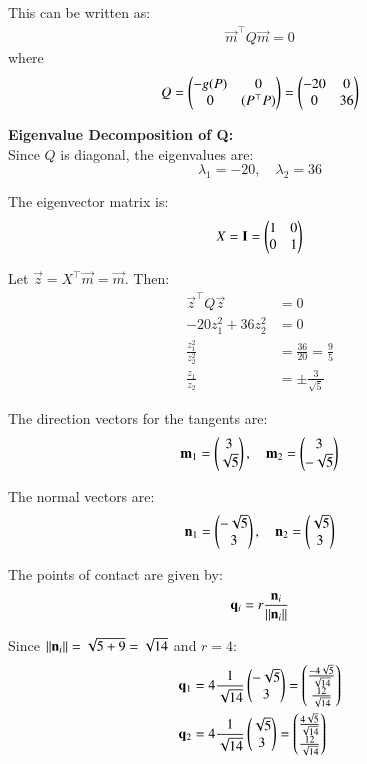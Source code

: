 \documentclass[article]{IEEEtran}
\begin{document}
	This can be written as:
	\begin{align}
		\vec{m}^\top Q\vec{m} = 0
	\end{align}
	where
	\begin{align}
		Q = \begin{pmatrix}-g(P) & 0\\0 & (P^\top P)\end{pmatrix} = \begin{pmatrix}-20 & 0\\0 & 36\end{pmatrix}
	\end{align}
	
	\textbf{Eigenvalue Decomposition of Q:}\\
	Since $Q$ is diagonal, the eigenvalues are:
	\begin{equation}
		\lambda_1 = -20, \quad \lambda_2 = 36
	\end{equation}
	
	The eigenvector matrix is:
	\begin{equation}
		X = \mathbf{I} = \begin{pmatrix}1 & 0\\0 & 1\end{pmatrix}
	\end{equation}
	
	Let $\vec{z} = X^\top\vec{m} = \vec{m}$. Then:
	\begin{align}
		\vec{z}^\top Q\vec{z} &= 0\\
		-20z_1^2 + 36z_2^2 &= 0\\
		\frac{z_1^2}{z_2^2} &= \frac{36}{20} = \frac{9}{5}\\
		\frac{z_1}{z_2} &= \pm\frac{3}{\sqrt{5}}
	\end{align}
	
	The direction vectors for the tangents are:
	\begin{align}
		\mathbf{m}_1 = \begin{pmatrix}3\\\sqrt{5}\end{pmatrix}, \quad \mathbf{m}_2 = \begin{pmatrix}3\\-\sqrt{5}\end{pmatrix}
	\end{align}
	
	The normal vectors are:
	\begin{align}
		\mathbf{n}_1 = \begin{pmatrix}-\sqrt{5}\\3\end{pmatrix}, \quad \mathbf{n}_2 = \begin{pmatrix}\sqrt{5}\\3\end{pmatrix}
	\end{align}
	
	The points of contact are given by:
	\begin{align}
		\mathbf{q}_i = r\frac{\mathbf{n}_i}{\left\lVert\mathbf{n}_i\right\rVert}
	\end{align}
	
	Since $\left\lVert\mathbf{n}_i\right\rVert = \sqrt{5 + 9} = \sqrt{14}$ and $r = 4$:
	\begin{align}
		\mathbf{q}_1 &= 4\frac{1}{\sqrt{14}}\begin{pmatrix}-\sqrt{5}\\3\end{pmatrix} = \begin{pmatrix}\frac{-4\sqrt{5}}{\sqrt{14}}\\\frac{12}{\sqrt{14}}\end{pmatrix}\\
		\mathbf{q}_2 &= 4\frac{1}{\sqrt{14}}\begin{pmatrix}\sqrt{5}\\3\end{pmatrix} = \begin{pmatrix}\frac{4\sqrt{5}}{\sqrt{14}}\\\frac{12}{\sqrt{14}}\end{pmatrix}
	\end{align}
	
\end{document}
